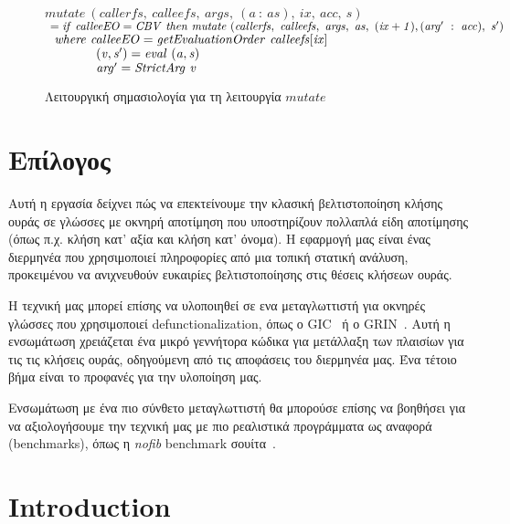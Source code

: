 \documentclass[diploma]{softlab-thesis}
\begin{document}
\begin{figure}[h]
  $\mathit{mutate~(callerfs,~calleefs,~args,~(a~:~as),~ix,~acc,~s)}$ \\ 
  $\mathit{\hfill\ =if~calleeEO=CBV~then~mutate~(callerfs,~calleefs,~args,~as,~(ix+1),(arg'~:~acc), ~s')}$ \\
  $\mathit{\hfill\ \hfill\ where~calleeEO=getEvaluationOrder~calleefs[ix]}$ \\  
  $\mathit{\hfill\ \hfill\ \hfill\ \hfill\ \hfill\ \hfill\ \hfill\ \hfill\ \hfill\ \hfill\ \hfill\ \hfill\ 
            (v, s') = eval~(a, s)}$ \\
  $\mathit{\hfill\ \hfill\ \hfill\ \hfill\ \hfill\ \hfill\ \hfill\ \hfill\ \hfill\ \hfill\ \hfill\ \hfill\ 
            arg'=StrictArg~v}$ \\
\caption{Λειτουργική σημασιολογία για τη λειτουργία $\mathit{mutate}$\label{fig:mutate-el}}
\end{figure}

%
\chapter{Επίλογος}

Αυτή η εργασία δείχνει πώς να επεκτείνουμε την κλασική βελτιστοποίηση κλήσης ουράς σε 
γλώσσες με οκνηρή αποτίμηση που υποστηρίζουν πολλαπλά είδη αποτίμησης (όπως π.χ.
κλήση κατ' αξία και κλήση κατ' όνομα). Η εφαρμογή μας είναι ένας
διερμηνέα που χρησιμοποιεί πληροφορίες από μια τοπική στατική ανάλυση, 
προκειμένου να ανιχνευθούν ευκαιρίες βελτιστοποίησης στις θέσεις κλήσεων ουράς.

Η τεχνική μας μπορεί επίσης να υλοποιηθεί σε ενα μεταγλωττιστή για οκνηρές 
γλώσσες που χρησιμοποιεί defunctionalization, όπως ο GIC~\cite{Fourtounis14} ή ο
GRIN~\cite{Boquist96,Podlovics19}.  Αυτή η ενσωμάτωση χρειάζεται ένα μικρό
γεννήτορα κώδικα για μετάλλαξη των πλαισίων για τις τις κλήσεις ουράς,
οδηγούμενη από τις αποφάσεις του διερμηνέα μας. Ένα τέτοιο βήμα είναι 
το προφανές για την υλοποίηση μας. 

Ενσωμάτωση με ένα πιο σύνθετο μεταγλωττιστή θα μπορούσε επίσης να βοηθήσει για να 
αξιολογήσουμε την τεχνική μας με πιο ρεαλιστικά προγράμματα ως αναφορά (benchmarks),
όπως η \emph{nofib} benchmark σουίτα~\cite{nofib}.



\englishtext

\chapter{Introduction}
\label{ch:introduction}
\end{document}
